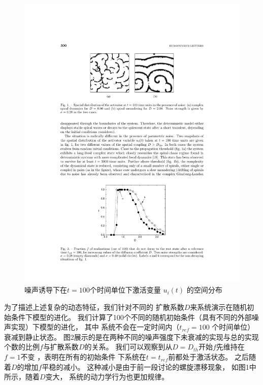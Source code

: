 \documentclass[
pdflinks,
]{xjtuthesis}
\begin{document}
\begin{figure}[!ht]
\centering
\includegraphics[scale=1]{figures/fig1.pdf}
\caption{噪声诱导下在$t = 100$个时间单位下激活变量 $u_i(t)$ 的空间分布}
\end{figure}

\medskip
为了描述上述复杂的动态特征，我们针对不同的
扩散系数$D$来系统演示在随机初始条件下模型的进化。 我们计算了100个不同的随机初始条件（具有不同的外部噪声实现）下模型的进化， 其中
系统不会在一定时间内（$t_{ref} = 100$
个时间单位）衰减到静⽌状态。 图2展示的是在两种不同的噪声强度下未衰减的实现与总的实现个数的比例$f$与扩散系数$D$的关系。 我们可以观察到从$D = D_{th}$开始$f$先维持在 $f = 1$不变 ，表明在所有的初始条件
下系统在$t=t_{ref}$前都处于激活状态。 之后随着$D$的增加$f$平稳的减小。 这种减小是由于前⼀段讨论的螺旋漂移现象，
如图1中所示，随着$D$变⼤， 系统的动力学行为也更加规律。
\end{document}
